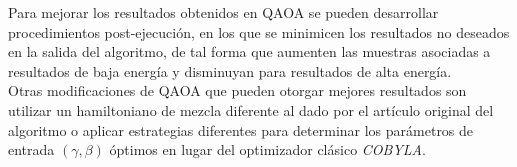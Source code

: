 Para mejorar los resultados obtenidos en QAOA se pueden desarrollar procedimientos post-ejecución, en los que se minimicen los resultados no deseados en la salida del algoritmo, de tal forma que aumenten las muestras asociadas a resultados de baja energía y disminuyan para resultados de alta energía.
\\
Otras modificaciones de QAOA que pueden otorgar mejores resultados son utilizar un hamiltoniano de mezcla diferente al dado por el artículo original del algoritmo o aplicar estrategias diferentes para determinar los parámetros de entrada $(\gamma, \beta)$ óptimos en lugar del optimizador clásico \textit{COBYLA}.


